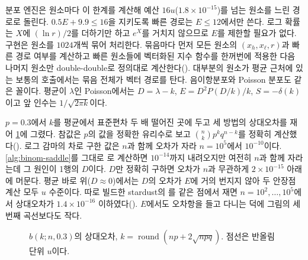 분포 엔진은 원소마다 이 한계를 계산해 예산 $16u$($1.8\times10^{-15}$)를 넘는 원소를 느린 경로로 돌린다. $0.5E+9.9\le16$을 지키도록 빠른 경로는 $E\le12$에서만 쓴다. 로그 확률 는 $X$에 $(\ln r)/2$를 더하기만 하고 $e^X$를 거치지 않으므로 $E$를 제한할 필요가 없다. 구현은 원소를 $1024$개씩 묶어 처리한다. 묶음마다 먼저 모든 원소의 $(x_h,x_\ell,r)$과 빠른 경로 여부를 계산하고 빠른 원소들에 벡터화된 지수 함수를 한꺼번에 적용한 다음 나머지 원소만 double-double로 정의대로 계산한다(). 대부분의 원소가 평균 근처에 있는 보통의 호출에서는 묶음 전체가 벡터 경로를 탄다. 음이항분포와 Poisson 분포도 같은 꼴이다. 평균이 $\lambda$인 Poisson에서는 $D=\lambda-k$, $E=D^2P(D/k)/k$, $S=-\delta(k)$이고 앞 인수는 $1/\sqrt{2\pi k}$이다.

$p=0.3$에서 $k$를 평균에서 표준편차 두 배 떨어진 곳에 두고 세 방법의 상대오차를 재어 \cref{fig:binom-pmf}에 그렸다. 참값은 $p$의  값을 정확한 유리수로 보고 $\binom nkp^kq^{n-k}$를 정확히 계산했다(). 로그 감마의 차로 구한 값은 $n$과 함께 오차가 자라 $n=10^5$에서 $10^{-10}$이다. \cref{alg:binom-saddle}를 그대로 로 계산하면 $10^{-14}$까지 내려오지만 여전히 $n$과 함께 자라는데 그 원인이 1행의 $D$이다. $D$만 정확히 구하면 오차가 $n$과 무관하게 $2\times10^{-15}$ 아래에 머문다. 평균 바로 위($D\approx0$)에서는 $D$의 오차가 $E$에 거의 번지지 않아 두 안장점 계산 모두 $u$ 수준이다. 따로 빌드한 stardust의 를 같은 점에서 재면 $n=10^2,\dots,10^5$에서 상대오차가 $1.4\times10^{-16}$ 이하였다(). $E$에서도 오차항을 들고 다니는 덕에 그림의 세 번째 곡선보다도 작다.

\begin{figure}[htbp]
\centering
{}
\caption{$b(k;n,0.3)$의 상대오차, $k=\operatorname{round}(np+2\sqrt{npq})$. 점선은 반올림 단위 $u$이다.}
\label{fig:binom-pmf}
\end{figure}

